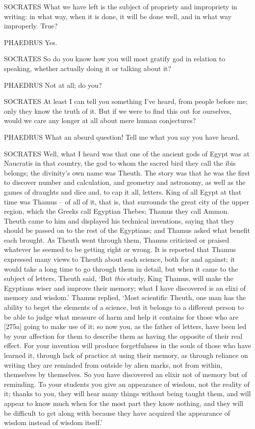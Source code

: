 SOCRATES What we have left is the subject of propriety and impropriety
in writing: in what way,
when it is done, it will be done well, and in what way improperly. True?

PHAEDRUS Yes.

SOCRATES So do you know how you will most gratify god in relation to
speaking, whether actually doing it or talking about  it?

PHAEDRUS Not at all; do you?

SOCRATES At least I can tell you something I've heard, from 
people before me; only they know the truth of it. But if we were to find
this out for ourselves, would we care any longer at all about mere human
conjectures?

PHAEDRUS What an absurd question! Tell me what you say you have heard.

SOCRATES Well, what I heard was that one of the ancient gods  of
Egypt was at Naucratis in that country, the god to whom the sacred bird
they call the ibis belongs; the divinity's own name was Theuth. The
story was that he was the first to discover number and calculation, and
geometry and astronomy, as well  as the games of draughts and
dice and, to cap it all, letters. King of all Egypt at that time was
Thamus -- of all of it, that is, that surrounds the great city of the
upper region, which the  Greeks call Egyptian Thebes; Thamus
they call Ammon. Theuth came to him and displayed his technical
inventions, saying that they should be passed on to the rest of the
Egyptians; and Thamus asked what benefit each brought. As Theuth went
 through them, Thamus criticized or praised whatever he seemed
to be getting right or wrong. It is reported that Thamus expressed many
views to Theuth about each science, both for and against; it would take
a long time to go through them in detail, but when it came to the
subject of letters, Theuth said,  ‘But {\em this} study, King
Thamus, will make the Egyptians wiser and improve their memory; what I
have discovered is an
elixi of memory and
wisdom.' Thamus replied, ‘Most scientific Theuth, one man has the
ability to beget the elements of a science, but it belongs to a
different person to be able to judge what measure of harm and help it
contains for those who are {[}275a{]} going to make use of it; so now
you, as the father of letters, have been led by your affection for them
to describe them as having the opposite of their real effect. For your
invention will produce forgetfulness in the souls of those who have
learned it, through lack of practice at using their memory, as through
reliance on writing they are reminded from outside by alien 
marks, not from within, themselves by
themselves. So you have
discovered an elixir not of memory but of reminding. To your students
you give an appearance of wisdom, not the reality of it; thanks to you,
they will hear many things without being  taught them, and will
appear to know much when for the most part they know nothing, and they
will be difficult to get along with because they have acquired the
appearance of wisdom instead of wisdom itself.'

